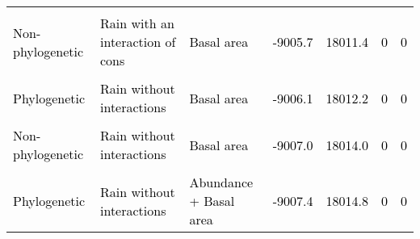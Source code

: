 \documentclass[
  12pt,
  letterpaper,
  DIV=11,
  numbers=noendperiod]{scrartcl}
\begin{document}
\begin{table}[H]
{\begin{tabular}[t]{lllllll}
\cellcolor{gray!6}{\textcolor{black}{Non-phylogenetic}} & \cellcolor{gray!6}{\textcolor{black}{Rain with an interaction of cons}} & \cellcolor{gray!6}{\textcolor{black}{Abundance + Basal area}} & \cellcolor{gray!6}{\textcolor{black}{-9005.4}} & \cellcolor{gray!6}{\textcolor{black}{18010.9}} & \cellcolor{gray!6}{\textcolor{black}{0}} & \cellcolor{gray!6}{\textcolor{black}{0}}\\
\textcolor{black}{Non-phylogenetic} & \textcolor{black}{Rain with an interaction of cons} & \textcolor{black}{Basal area} & \textcolor{black}{-9005.7} & \textcolor{black}{18011.4} & \textcolor{black}{0} & \textcolor{black}{0}\\
\cellcolor{gray!6}{\textcolor{black}{Phylogenetic}} & \cellcolor{gray!6}{\textcolor{black}{Rain without interactions}} & \cellcolor{gray!6}{\textcolor{black}{Abundance}} & \cellcolor{gray!6}{\textcolor{black}{-9005.7}} & \cellcolor{gray!6}{\textcolor{black}{18011.4}} & \cellcolor{gray!6}{\textcolor{black}{0}} & \cellcolor{gray!6}{\textcolor{black}{0}}\\
\addlinespace
\textcolor{black}{Phylogenetic} & \textcolor{black}{Rain without interactions} & \textcolor{black}{Basal area} & \textcolor{black}{-9006.1} & \textcolor{black}{18012.2} & \textcolor{black}{0} & \textcolor{black}{0}\\
\cellcolor{gray!6}{\textcolor{black}{Phylogenetic}} & \cellcolor{gray!6}{\textcolor{black}{Rain with an interaction of cons}} & \cellcolor{gray!6}{\textcolor{black}{Abundance + Basal area}} & \cellcolor{gray!6}{\textcolor{black}{-9006.2}} & \cellcolor{gray!6}{\textcolor{black}{18012.5}} & \cellcolor{gray!6}{\textcolor{black}{0}} & \cellcolor{gray!6}{\textcolor{black}{0}}\\
\textcolor{black}{Non-phylogenetic} & \textcolor{black}{Rain without interactions} & \textcolor{black}{Basal area} & \textcolor{black}{-9007.0} & \textcolor{black}{18014.0} & \textcolor{black}{0} & \textcolor{black}{0}\\
\cellcolor{gray!6}{\textcolor{black}{Phylogenetic}} & \cellcolor{gray!6}{\textcolor{black}{No rain}} & \cellcolor{gray!6}{\textcolor{black}{Basal area}} & \cellcolor{gray!6}{\textcolor{black}{-9007.4}} & \cellcolor{gray!6}{\textcolor{black}{18014.8}} & \cellcolor{gray!6}{\textcolor{black}{0}} & \cellcolor{gray!6}{\textcolor{black}{0}}\\
\textcolor{black}{Phylogenetic} & \textcolor{black}{Rain without interactions} & \textcolor{black}{Abundance + Basal area} & \textcolor{black}{-9007.4} & \textcolor{black}{18014.8} & \textcolor{black}{0} & \textcolor{black}{0}\\

\end{tabular}}
\end{table}
\end{document}
